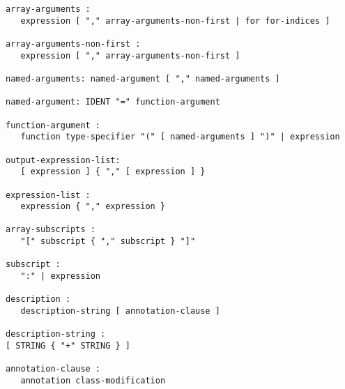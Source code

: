 \begin{lstlisting}[language=grammar]
array-arguments :
   expression [ "," array-arguments-non-first | for for-indices ]

array-arguments-non-first :
   expression [ "," array-arguments-non-first ]

named-arguments: named-argument [ "," named-arguments ]

named-argument: IDENT "=" function-argument

function-argument :
   function type-specifier "(" [ named-arguments ] ")" | expression

output-expression-list:
   [ expression ] { "," [ expression ] }

expression-list :
   expression { "," expression }

array-subscripts :
   "[" subscript { "," subscript } "]"

subscript :
   ":" | expression

description :
   description-string [ annotation-clause ]

description-string :
[ STRING { "+" STRING } ]

annotation-clause :
   annotation class-modification
\end{lstlisting}
